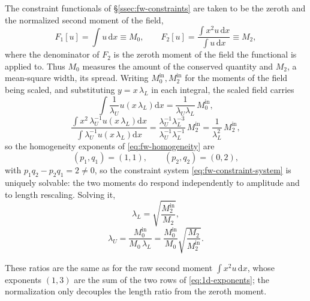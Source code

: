 \documentclass{article}
\begin{document}
The constraint functionals of \S\ref{ssec:fw-constraints} are taken to be the
zeroth and the normalized second moment of the field,
\begin{equation}\label{eq:1d-functionals}
  F_1[u] = \int u\, \mathrm{d}x \equiv M_0,
  \qquad
  F_2[u] = \frac{\int x^2 u\, \mathrm{d}x}{\int u\, \mathrm{d}x} \equiv M_2,
\end{equation}
where the denominator of $F_2$ is the zeroth moment of the field the
functional is applied to. Thus $M_0$ measures the amount of the conserved quantity and $M_2$, a mean-square
width, its spread. Writing $M_0^{\mathrm{in}}, M_2^{\mathrm{in}}$ for the moments of the field being scaled, and
substituting $y = x\, \lambda_L$ in each integral, the scaled field carries
\begin{equation}\label{eq:1d-m0-homogeneity}
  \int \frac{1}{\lambda_U} u\!\left( x\, \lambda_L \right) \mathrm{d}x
  = \frac{1}{\lambda_U \lambda_L}\, M_0^{\mathrm{in}},
\end{equation}
\begin{equation}\label{eq:1d-m2-homogeneity}
  \frac{\int x^2\, \lambda_U^{-1} u\!\left( x\, \lambda_L \right) \mathrm{d}x}
       {\int \lambda_U^{-1} u\!\left( x\, \lambda_L \right) \mathrm{d}x}
  = \frac{\lambda_U^{-1} \lambda_L^{-3}}{\lambda_U^{-1} \lambda_L^{-1}}\, M_2^{\mathrm{in}}
  = \frac{1}{\lambda_L^{2}}\, M_2^{\mathrm{in}},
\end{equation}
so the homogeneity exponents of \eqref{eq:fw-homogeneity} are
\begin{equation}\label{eq:1d-exponents}
  (p_1, q_1) = (1, 1), \qquad (p_2, q_2) = (0, 2),
\end{equation}
with $p_1 q_2 - p_2 q_1 = 2 \neq 0$, so the constraint system
\eqref{eq:fw-constraint-system} is uniquely solvable: the two moments do
respond independently to amplitude and to length rescaling. Solving it,
\begin{equation}\label{eq:1d-length-ratio}
  \lambda_L = \sqrt{\frac{M_2^{\mathrm{in}}}{M_2}},
\end{equation}
\begin{equation}\label{eq:1d-velocity-ratio}
  \lambda_U = \frac{M_0^{\mathrm{in}}}{M_0\, \lambda_L}
  = \frac{M_0^{\mathrm{in}}}{M_0} \sqrt{\frac{M_2}{M_2^{\mathrm{in}}}} .
\end{equation}

These ratios are the same as for the raw second moment
$\int x^2 u\, \mathrm{d}x$, whose exponents $(1, 3)$ are the sum of the two
rows of \eqref{eq:1d-exponents}; the normalization only decouples the length
ratio from the zeroth moment.
\end{document}
